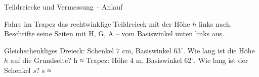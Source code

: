 \setcounter{aufgabe}{0}

\begin{aufgabe}{Teildreiecke und Vermessung – Anlauf}
\begin{teile}
\teil Fahre im Trapez das rechtwinklige Teildreieck mit der Höhe $h$ links nach. Beschrifte seine Seiten mit H, G, A – vom Basiswinkel unten links aus.

\teil Gleichschenkliges Dreieck: Schenkel $7$ cm, Basiswinkel $63^\circ$. Wie lang ist die Höhe $h$ auf die Grundseite? h ≈ \leerfeld[cm]
\teil Trapez: Höhe $4$ m, Basiswinkel $62^\circ$. Wie lang ist der Schenkel $s$? s ≈ \leerfeld[m]
\end{teile}
\end{aufgabe}

